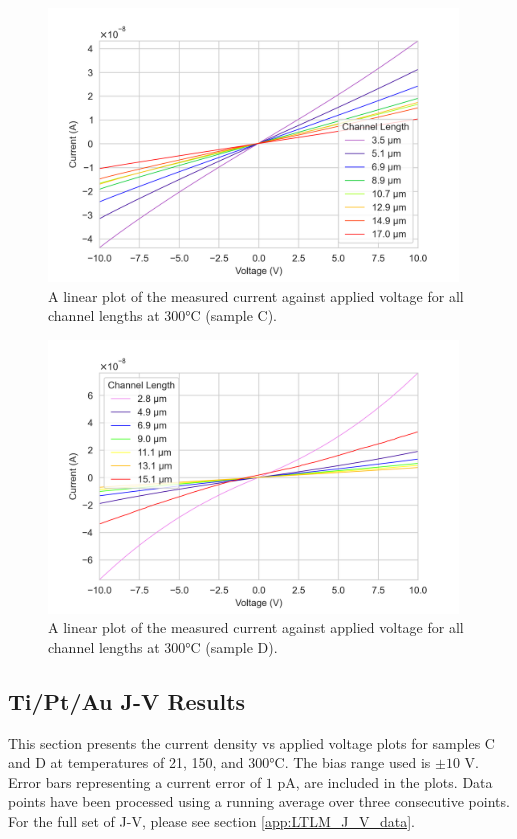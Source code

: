 \begin{figure}[h]
    \centering
    \includegraphics[width=0.97\textwidth]{Chapter6/Figs/Raster/Sample C 2019/IV/10V IV characteristics at 300 C.png}
    \caption{A linear plot of the measured current against applied voltage for all channel lengths at 300\si{\degreeCelsius} (sample C).}
    \label{fig:C_current_voltage_300}
\end{figure}
\begin{figure}[h]
    \centering
    \includegraphics[width=0.97\textwidth]{Chapter6/Figs/Raster/Sample D 2019/IV/10V IV characteristics at 300 C.png}
    \caption{A linear plot of the measured current against applied voltage for all channel lengths at 300\si{\degreeCelsius} (sample D).}
    \label{fig:D_current_voltage_300_10V}
\end{figure}

\FloatBarrier

\subsection{Ti/Pt/Au J-V Results}
This section presents the current density vs applied voltage plots for samples C and D at temperatures of 21, 150, and 300\si{\degreeCelsius}. The bias range used is $\pm10$ \si{\volt}. Error bars representing a current error of $1$ \si{\pico\ampere}, are included in the plots. Data points have been processed using a running average over three consecutive points. For the full set of J-V, please see section \ref{app:LTLM_J_V_data}.

